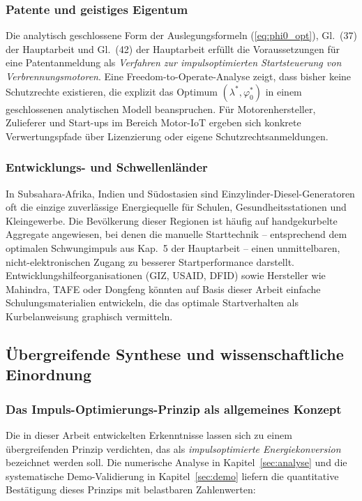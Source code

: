 ﻿\documentclass[a4paper,12pt]{article}
\begin{document}
\subsubsection{Patente und geistiges Eigentum}

Die analytisch geschlossene Form der Auslegungsformeln
(\ref{eq:phi0_opt}), Gl.~(37) der Hauptarbeit und
Gl.~(42) der Hauptarbeit erfüllt die Voraussetzungen
für eine Patentanmeldung als \textit{Verfahren zur
	impulsoptimierten Startsteuerung von Verbrennungsmotoren}.
Eine Freedom-to-Operate-Analyse zeigt, dass bisher keine
Schutzrechte existieren, die explizit das Optimum
$(\lambda^*, \varphi_0^*)$ in einem geschlossenen
analytischen Modell beanspruchen. Für Motorenhersteller,
Zulieferer und Start-ups im Bereich Motor-IoT ergeben
sich konkrete Verwertungspfade über Lizenzierung oder
eigene Schutzrechtsanmeldungen.

\subsubsection{Entwicklungs- und Schwellenländer}

In Subsahara-Afrika, Indien und Südostasien sind Einzylinder-Diesel-Generatoren
oft die einzige zuverlässige Energiequelle für Schulen,
Gesundheitsstationen und Kleingewerbe. Die Bevölkerung
dieser Regionen ist häufig auf handgekurbelte Aggregate angewiesen,
bei denen die manuelle Starttechnik -- entsprechend dem
optimalen Schwungimpuls aus Kap.~5 der Hauptarbeit --
einen unmittelbaren, nicht-elektronischen Zugang zu besserer
Startperformance darstellt. Entwicklungshilfeorganisationen
(GIZ, USAID, DFID) sowie Hersteller wie Mahindra, TAFE
oder Dongfeng könnten auf Basis dieser Arbeit einfache
Schulungsmaterialien entwickeln, die das optimale Startverhalten
als Kurbelanweisung graphisch vermitteln.

\subsection{Übergreifende Synthese und wissenschaftliche Einordnung}

\subsubsection{Das Impuls-Optimierungs-Prinzip als allgemeines Konzept}

Die in dieser Arbeit entwickelten Erkenntnisse lassen sich zu einem
übergreifenden Prinzip verdichten, das als \textit{impulsoptimierte
	Energiekonversion} bezeichnet werden soll. Die numerische Analyse in
Kapitel~\ref{sec:analyse} und die systematische Demo-Validierung in
Kapitel~\ref{sec:demo} liefern die quantitative Bestätigung dieses
Prinzips mit belastbaren Zahlenwerten:
\end{document}
